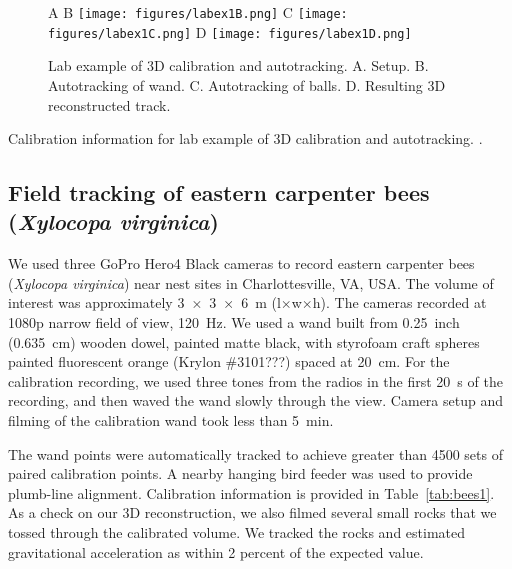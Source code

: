 \documentclass[fleqn,10pt]{wlpeerj}
\newcommand{\Xylocopavirginica}{\emph{Xylocopa virginica}}
\begin{document}
\begin{figure}
\caption{Lab example of 3D calibration and autotracking.  A. Setup.  B. Autotracking of wand.  C.  Autotracking of balls.  D.  Resulting 3D reconstructed track. }
\label{fig:labex1}
A
B \texttt{[image: figures/labex1B.png]}
C \texttt{[image: figures/labex1C.png]}
D \texttt{[image: figures/labex1D.png]}
\end{figure}

\begin{table}
\caption{Calibration information for lab example of 3D calibration and autotracking. .}
\label{tab:labex2}
\begin{center}
\end{center}
\end{table}






\subsection*{Field tracking of eastern carpenter bees (\Xylocopavirginica)}
We used three GoPro Hero4 Black cameras to record eastern carpenter bees (\Xylocopavirginica) near nest sites in Charlottesville, VA, USA.  
The volume of interest was approximately \SI{3x3x6}{\meter} (l$\times$w$\times$h).  The cameras recorded at 1080p narrow field of view, \SI{120}{\hertz}.  We used a wand built from \SI{0.25}{inch} (\SI{0.635}{\centi\meter}) wooden dowel, painted matte black, with styrofoam craft spheres painted fluorescent orange (Krylon \#3101???) spaced at \SI{20}{\centi\meter}.  For the calibration recording, we used three tones from the radios in the first \SI{20}{\second} of the recording, and then waved the wand slowly through the view.  Camera setup and filming of the calibration wand took less than \SI{5}{\minute}.

The wand points were automatically tracked to achieve greater than 4500 sets of paired calibration points.  A nearby hanging bird feeder was used to provide plumb-line alignment.  Calibration information is provided in Table~\ref{tab:bees1}.  As a check on our 3D reconstruction, we also filmed several small rocks that we tossed through the calibrated volume.  We tracked the rocks and estimated gravitational acceleration as within 2 percent of the expected value.  
\end{document}
